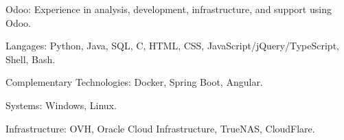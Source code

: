 \begin{indentsection}{\parindent}
  \begin{description*}
    \item[Odoo:] Experience in analysis, development, infrastructure, and support using Odoo.
    \item[Langages:] Python, Java, SQL, C, HTML, CSS, JavaScript/jQuery/TypeScript, Shell, Bash.
    \item[Complementary Technologies:] Docker, Spring Boot, Angular.
    \item[Systems:] Windows, Linux.
    \item[Infrastructure:] OVH, Oracle Cloud Infrastructure, TrueNAS, CloudFlare.

  \end{description*}
\end{indentsection}
